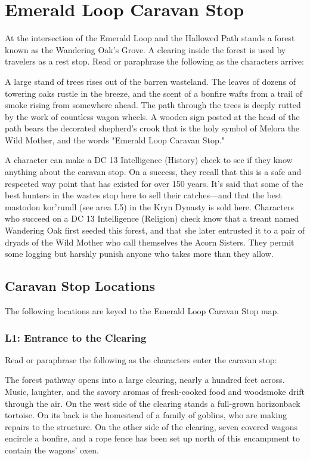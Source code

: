 \documentclass[10pt,a4,twoside,twocolumn,openany,nodeprecatedcode]{dndbook}
\begin{document}
\section{Emerald Loop Caravan Stop}
At the intersection of the Emerald Loop and the Hallowed Path stands a forest known as the Wandering Oak's Grove. A clearing inside the forest is used by travelers as a rest stop. Read or paraphrase the following as the characters arrive:
\begin{DndReadAloud}{}
A large stand of trees rises out of the barren wasteland. The leaves of dozens of towering oaks rustle in the breeze, and the scent of a bonfire wafts from a trail of smoke rising from somewhere ahead. The path through the trees is deeply rutted by the work of countless wagon wheels. A wooden sign posted at the head of the path bears the decorated shepherd's crook that is the holy symbol of Melora the Wild Mother, and the words "Emerald Loop Caravan Stop."
\end{DndReadAloud}

A character can make a DC 13 Intelligence (History) check to see if they know anything about the caravan stop. On a success, they recall that this is a safe and respected way point that has existed for over 150 years. It's said that some of the best hunters in the wastes stop here to sell their catches—and that the best mastodon kor'rundl (see area L5) in the Kryn Dynasty is sold here.
Characters who succeed on a DC 13 Intelligence (Religion) check know that a treant named Wandering Oak first seeded this forest, and that she later entrusted it to a pair of dryads of the Wild Mother who call themselves the Acorn Sisters. They permit some logging but harshly punish anyone who takes more than they allow.
\subsection{Caravan Stop Locations}
The following locations are keyed to the Emerald Loop Caravan Stop map.
\subsubsection{L1: Entrance to the Clearing}
Read or paraphrase the following as the characters enter the caravan stop:
\begin{DndReadAloud}{}
The forest pathway opens into a large clearing, nearly a hundred feet across. Music, laughter, and the savory aromas of fresh-cooked food and woodsmoke drift through the air. On the west side of the clearing stands a full-grown horizonback tortoise. On its back is the homestead of a family of goblins, who are making repairs to the structure. On the other side of the clearing, seven covered wagons encircle a bonfire, and a rope fence has been set up north of this encampment to contain the wagons' oxen.
\end{DndReadAloud}
\end{document}
